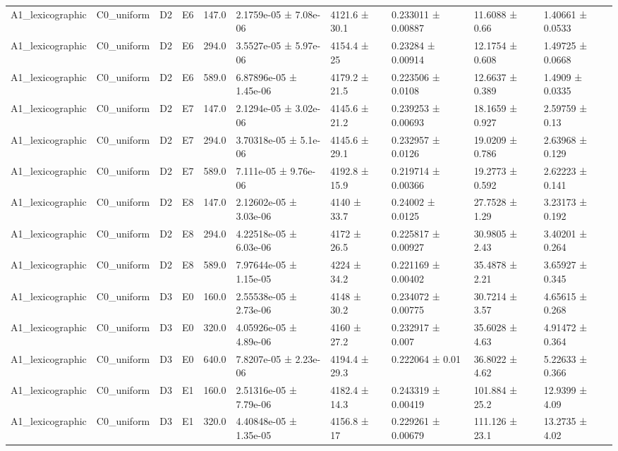 \begin{table}
\begin{tabular}{llllllllll}
A1\_lexicographic & C0\_uniform & D2 & E6 & 147.0 & 2.1759e-05 ± 7.08e-06 & 4121.6 ± 30.1 & 0.233011 ± 0.00887 & 11.6088 ± 0.66 & 1.40661 ± 0.0533 \\
A1\_lexicographic & C0\_uniform & D2 & E6 & 294.0 & 3.5527e-05 ± 5.97e-06 & 4154.4 ± 25 & 0.23284 ± 0.00914 & 12.1754 ± 0.608 & 1.49725 ± 0.0668 \\
A1\_lexicographic & C0\_uniform & D2 & E6 & 589.0 & 6.87896e-05 ± 1.45e-06 & 4179.2 ± 21.5 & 0.223506 ± 0.0108 & 12.6637 ± 0.389 & 1.4909 ± 0.0335 \\
A1\_lexicographic & C0\_uniform & D2 & E7 & 147.0 & 2.1294e-05 ± 3.02e-06 & 4145.6 ± 21.2 & 0.239253 ± 0.00693 & 18.1659 ± 0.927 & 2.59759 ± 0.13 \\
A1\_lexicographic & C0\_uniform & D2 & E7 & 294.0 & 3.70318e-05 ± 5.1e-06 & 4145.6 ± 29.1 & 0.232957 ± 0.0126 & 19.0209 ± 0.786 & 2.63968 ± 0.129 \\
A1\_lexicographic & C0\_uniform & D2 & E7 & 589.0 & 7.111e-05 ± 9.76e-06 & 4192.8 ± 15.9 & 0.219714 ± 0.00366 & 19.2773 ± 0.592 & 2.62223 ± 0.141 \\
A1\_lexicographic & C0\_uniform & D2 & E8 & 147.0 & 2.12602e-05 ± 3.03e-06 & 4140 ± 33.7 & 0.24002 ± 0.0125 & 27.7528 ± 1.29 & 3.23173 ± 0.192 \\
A1\_lexicographic & C0\_uniform & D2 & E8 & 294.0 & 4.22518e-05 ± 6.03e-06 & 4172 ± 26.5 & 0.225817 ± 0.00927 & 30.9805 ± 2.43 & 3.40201 ± 0.264 \\
A1\_lexicographic & C0\_uniform & D2 & E8 & 589.0 & 7.97644e-05 ± 1.15e-05 & 4224 ± 34.2 & 0.221169 ± 0.00402 & 35.4878 ± 2.21 & 3.65927 ± 0.345 \\
A1\_lexicographic & C0\_uniform & D3 & E0 & 160.0 & 2.55538e-05 ± 2.73e-06 & 4148 ± 30.2 & 0.234072 ± 0.00775 & 30.7214 ± 3.57 & 4.65615 ± 0.268 \\
A1\_lexicographic & C0\_uniform & D3 & E0 & 320.0 & 4.05926e-05 ± 4.89e-06 & 4160 ± 27.2 & 0.232917 ± 0.007 & 35.6028 ± 4.63 & 4.91472 ± 0.364 \\
A1\_lexicographic & C0\_uniform & D3 & E0 & 640.0 & 7.8207e-05 ± 2.23e-06 & 4194.4 ± 29.3 & 0.222064 ± 0.01 & 36.8022 ± 4.62 & 5.22633 ± 0.366 \\
A1\_lexicographic & C0\_uniform & D3 & E1 & 160.0 & 2.51316e-05 ± 7.79e-06 & 4182.4 ± 14.3 & 0.243319 ± 0.00419 & 101.884 ± 25.2 & 12.9399 ± 4.09 \\
A1\_lexicographic & C0\_uniform & D3 & E1 & 320.0 & 4.40848e-05 ± 1.35e-05 & 4156.8 ± 17 & 0.229261 ± 0.00679 & 111.126 ± 23.1 & 13.2735 ± 4.02 \\

\end{tabular}
\end{table}
